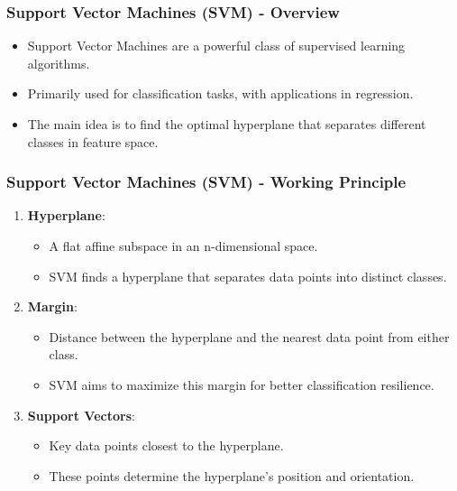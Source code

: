 \documentclass[aspectratio=169]{beamer}
\begin{document}
\begin{frame}
    \frametitle{Support Vector Machines (SVM) - Overview}
    \begin{itemize}
        \item Support Vector Machines are a powerful class of supervised learning algorithms.
        \item Primarily used for classification tasks, with applications in regression.
        \item The main idea is to find the optimal hyperplane that separates different classes in feature space.
    \end{itemize}
\end{frame}

\begin{frame}
    \frametitle{Support Vector Machines (SVM) - Working Principle}
    \begin{enumerate}
        \item \textbf{Hyperplane}:
            \begin{itemize}
                \item A flat affine subspace in an n-dimensional space.
                \item SVM finds a hyperplane that separates data points into distinct classes.
            \end{itemize}
        \item \textbf{Margin}:
            \begin{itemize}
                \item Distance between the hyperplane and the nearest data point from either class.
                \item SVM aims to maximize this margin for better classification resilience.
            \end{itemize}
        \item \textbf{Support Vectors}:
            \begin{itemize}
                \item Key data points closest to the hyperplane.
                \item These points determine the hyperplane's position and orientation.
            \end{itemize}
    \end{enumerate}
\end{frame}
\end{document}
